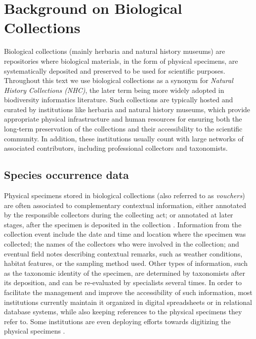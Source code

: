 \chapter{Background on Biological Collections}\label{biodiversity_data}



Biological collections (mainly herbaria and natural history museums) are repositories where biological materials, in the form of physical specimens, are systematically deposited and preserved to be used for scientific purposes. 
Throughout this text we use biological collections as a synonym for \textit{Natural History Collections (NHC)}, the later term being more widely adopted in biodiversity informatics literature.
Such collections are typically hosted and curated by institutions like herbaria and natural history museums, which provide appropriate physical infrastructure and human resources for ensuring both the long-term preservation of the collections and their accessibility to the scientific community.
In addition, these institutions usually count with large networks of associated contributors, including professional collectors and taxonomists.

\section{Species occurrence data}
Physical specimens stored in biological collections (also referred to as \textit{vouchers}) are often associated to complementary contextual information, either annotated by the responsible collectors during the collecting act; or annotated at later stages, after the specimen is deposited in the collection \cite{Chapman2005}. %
Information from the collection event include the date and time and location where the specimen was collected; the names of the collectors who were involved in the collection; and eventual field notes describing contextual remarks, such as weather conditions, habitat features, or the sampling method used.
Other types of information, such as the taxonomic identity of the specimen, are determined by taxonomists after its deposition, and can be re-evaluated by specialists several times.
In order to facilitate the management and improve the accessibility of such information, most institutions currently maintain it organized in digital spreadsheets or in relational database systems, while also keeping references to the physical specimens they refer to.
Some institutions are even deploying efforts towards digitizing the physical specimens \cite{}.

